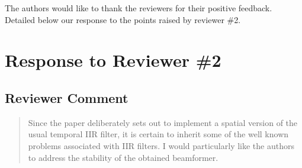 The authors would like to thank the reviewers for their positive feedback. Detailed below our response to the points raised by reviewer \#2.

\section{Response to Reviewer \#2}




\subsection{Reviewer Comment}
\begin{mdframed}
\begin{quote}
Since the paper deliberately sets out to implement a spatial version of the usual temporal IIR filter, it is certain to inherit some of the well known problems associated with IIR filters. I would particularly like the authors to address the stability of the obtained beamformer.
\end{quote}
\end{mdframed}


